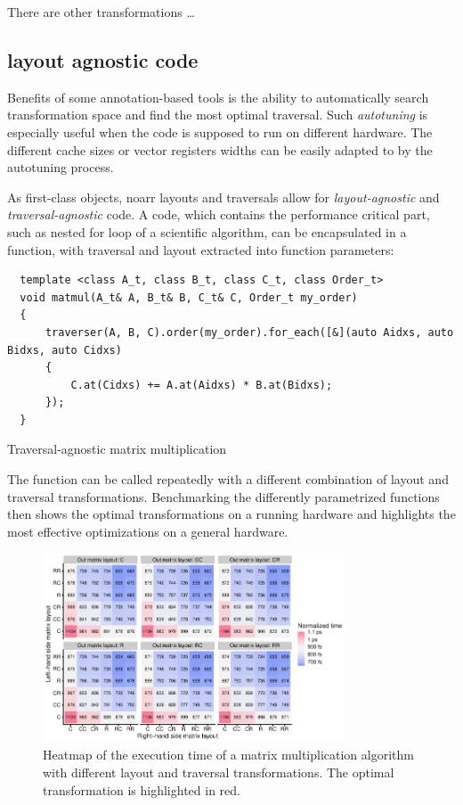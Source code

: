 There are other transformations \dots



\subsection{layout agnostic code}

Benefits of some annotation-based tools is the ability to automatically search transformation space and find the most optimal traversal. Such \emph{autotuning} is especially useful when the code is supposed to run on different hardware. The different cache sizes or vector registers widths can be easily adapted to by the autotuning process.

As first-class objects, noarr layouts and traversals allow for \emph{layout-agnostic} and \emph{traversal-agnostic} code. A code, which contains the performance critical part, such as nested for loop of a scientific algorithm, can be encapsulated in a function, with traversal and layout extracted into function parameters:
\begin{listing}
  \begin{verbatim}
  template <class A_t, class B_t, class C_t, class Order_t>
  void matmul(A_t& A, B_t& B, C_t& C, Order_t my_order) 
  {
      traverser(A, B, C).order(my_order).for_each([&](auto Aidxs, auto Bidxs, auto Cidxs)
      {
          C.at(Cidxs) += A.at(Aidxs) * B.at(Bidxs);
      });
  }
  \end{verbatim}
  \caption{Traversal-agnostic matrix multiplication}
  \label{lst:agn}
\end{listing}

The function can be called repeatedly with a different combination of layout and traversal transformations. Benchmarking the differently parametrized functions then shows the optimal transformations on a running hardware and highlights the most effective optimizations on a general hardware.


\begin{figure}
  \centering
  \includegraphics[width=0.8\textwidth]{img/heatmap_all}
  \caption{Heatmap of the execution time of a matrix multiplication algorithm with different layout and traversal transformations. The optimal transformation is highlighted in red.}
  \label{fig:heatmap_all}
\end{figure}

